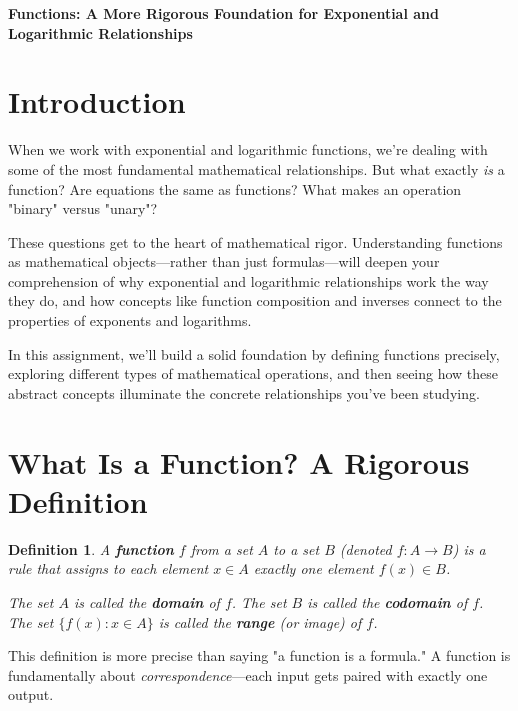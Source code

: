 \documentclass[12pt]{article}
\newtheorem{definition}{Definition}
\begin{document}
\begin{center}
\textbf{\Large Functions: A More Rigorous Foundation for Exponential and Logarithmic Relationships} \\
\vspace{0.5cm}
\hspace{0.1\textwidth}
\end{center}

\vspace{0.5cm}

\section{Introduction}

When we work with exponential and logarithmic functions, we're dealing with some of the most fundamental mathematical relationships. But what exactly \textit{is} a function? Are equations the same as functions? What makes an operation "binary" versus "unary"? 

These questions get to the heart of mathematical rigor. Understanding functions as mathematical objects—rather than just formulas—will deepen your comprehension of why exponential and logarithmic relationships work the way they do, and how concepts like function composition and inverses connect to the properties of exponents and logarithms.

In this assignment, we'll build a solid foundation by defining functions precisely, exploring different types of mathematical operations, and then seeing how these abstract concepts illuminate the concrete relationships you've been studying.

\section{What Is a Function? A Rigorous Definition}

\begin{definition}
A \textbf{function} $f$ from a set $A$ to a set $B$ (denoted $f: A \to B$) is a rule that assigns to each element $x \in A$ exactly one element $f(x) \in B$.

The set $A$ is called the \textbf{domain} of $f$.
The set $B$ is called the \textbf{codomain} of $f$.
The set $\{f(x) : x \in A\}$ is called the \textbf{range} (or image) of $f$.
\end{definition}

This definition is more precise than saying "a function is a formula." A function is fundamentally about \textit{correspondence}—each input gets paired with exactly one output.
\end{document}
